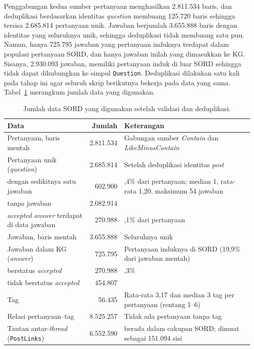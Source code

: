 Penggabungan kedua sumber pertanyaan menghasilkan 2.811.534 baris, dan deduplikasi berdasarkan identitas \emph{question} membuang 125.720 baris sehingga tersisa 2.685.814 pertanyaan unik. Jawaban berjumlah 3.655.888 baris dengan identitas yang seluruhnya unik, sehingga deduplikasi tidak membuang satu pun. Namun, hanya 725.795 jawaban yang pertanyaan induknya terdapat dalam populasi pertanyaan SORD, dan hanya jawaban inilah yang dimasukkan ke KG. Sisanya, 2.930.093 jawaban, memiliki pertanyaan induk di luar SORD sehingga tidak dapat dihubungkan ke simpul \texttt{Question}. Deduplikasi dilakukan satu kali pada tahap ini agar seluruh skrip berikutnya bekerja pada data yang sama. Tabel~\ref{tab:populasi-data} merangkum jumlah data yang digunakan.

\begin{table}[!htbp]
\centering
\small
\caption{Jumlah data SORD yang digunakan setelah validasi dan deduplikasi.}
\label{tab:populasi-data}
\renewcommand{\arraystretch}{1.2}
\begin{tabularx}{\textwidth}{|>{\raggedright\arraybackslash}p{6.0cm}|r|>{\raggedright\arraybackslash}X|}
\hline
\textbf{Data} & \textbf{Jumlah} & \textbf{Keterangan} \\
\hline
Pertanyaan, baris mentah & 2.811.534 & Gabungan sumber \emph{Contain} dan \emph{LikeMinusContain} \\
Pertanyaan unik (\emph{question}) & 2.685.814 & Setelah deduplikasi identitas \emph{post} \\
\quad dengan sedikitnya satu jawaban & 602.900 & 22,4\% dari pertanyaan; median 1, rata-rata 1,20, maksimum 54 jawaban \\
\quad tanpa jawaban & 2.082.914 & \\
\quad \emph{accepted answer} terdapat di data jawaban & 270.988 & 10,1\% dari pertanyaan \\
Jawaban, baris mentah & 3.655.888 & Seluruhnya unik \\
Jawaban dalam KG (\emph{answer}) & 725.795 & Pertanyaan induknya di SORD (19,9\% dari jawaban mentah) \\
\quad berstatus \emph{accepted} & 270.988 & 37,3\% \\
\quad tidak berstatus \emph{accepted} & 454.807 & \\
Tag & 56.435 & Rata-rata 3,17 dan median 3 tag per pertanyaan (rentang 1--6) \\
Relasi pertanyaan--tag & 8.525.257 & Tidak ada pertanyaan tanpa tag \\
Tautan antar-\emph{thread} (\texttt{PostLinks}) & 6.552.590 & 160.647 berada dalam cakupan SORD; dimuat sebagai 151.094 sisi \\
\hline
\end{tabularx}
\end{table}

